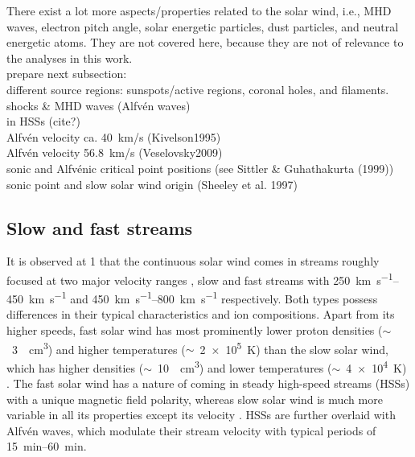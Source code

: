 There exist a lot more aspects/properties related to the solar wind, i.e., MHD waves, electron pitch angle, solar energetic particles, dust particles, and neutral energetic atoms. They are not covered here, because they are not of relevance to the analyses in this work.\\


prepare next subsection:\\
different source regions: sunspots/active regions, coronal holes, and filaments.\\

shocks \& MHD waves (Alfvén waves)\\
in HSSs (cite?)\\
Alfvén velocity ca. 40~km/s (Kivelson1995)\\
Alfvén velocity 56.8~km/s (Veselovsky2009)\\

sonic and Alfvénic critical point positions (see Sittler \& Guhathakurta (1999))\\
sonic point and slow solar wind origin (Sheeley et al. 1997)\\


\subsection{Slow and fast streams}
It is observed at \SI{1}{\au} that the continuous solar wind comes in streams roughly focused at two major velocity ranges \citep{Neugebauer1966,Schwenn1983}, slow and fast streams with \SIrange{250}{450}{\km\per\s} and \SIrange{450}{800}{\km\per\s} respectively. Both types possess differences in their typical characteristics and ion compositions. Apart from its higher speeds, fast solar wind has most prominently lower proton densities ($\sim$~\SI{3}{\per\cm\cubed}) and higher temperatures ($\sim$~\SI{2e5}{\K}) than the slow solar wind, which has higher densities ($\sim$~\SI{10}{\per\cm\cubed}) and lower temperatures ($\sim$~\SI{4e4}{\K}) \citep{Schwenn1990}. The fast solar wind has a nature of coming in steady high-speed streams (HSSs) with a unique magnetic field polarity, whereas slow solar wind is much more variable in all its properties except its velocity \citep{Bame1977}. HSSs are further overlaid with Alfvén waves, which modulate their stream velocity with typical periods of \SIrange{15}{60}{\minute}.

